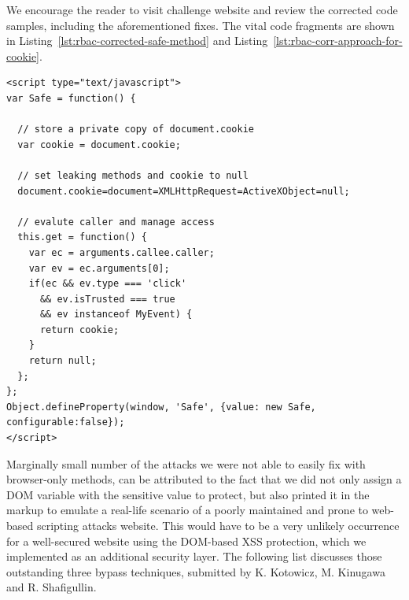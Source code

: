       We encourage the reader to visit challenge website and review the corrected code samples, including the aforementioned fixes. The vital code fragments are shown in Listing~\ref{lst:rbac-corrected-safe-method} and Listing~\ref{lst:rbac-corr-approach-for-cookie}. 

\begin{lstlisting}[captionpos=b,label=lst:rbac-corrected-safe-method,caption=Corrected safe getter with caller verification; A custom sealed event prevents an attacker from overwriting it and thereby authenticates the click as ``real'']
<script type="text/javascript">
var Safe = function() {

  // store a private copy of document.cookie
  var cookie = document.cookie;

  // set leaking methods and cookie to null
  document.cookie=document=XMLHttpRequest=ActiveXObject=null;

  // evalute caller and manage access
  this.get = function() { 
    var ec = arguments.callee.caller;
    var ev = ec.arguments[0];
    if(ec && ev.type === 'click'
      && ev.isTrusted === true
      && ev instanceof MyEvent) {
      return cookie;
    }
    return null;
  };       
};
Object.defineProperty(window, 'Safe', {value: new Safe, configurable:false});
</script>
\end{lstlisting}

      Marginally small number of the attacks we were not able to easily fix with browser-only methods, can be attributed to the fact that we did not only assign a DOM variable with the sensitive value to protect, but also printed it in the markup to emulate a real-life scenario of a poorly maintained and prone to web-based scripting attacks website. This would have to be a very unlikely occurrence for a well-secured website using the DOM-based XSS protection, which we implemented as an additional security layer. The following list discusses those outstanding three bypass techniques, submitted by K. Kotowicz, M. Kinugawa and R. Shafigullin.\\

